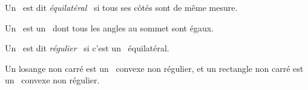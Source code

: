 \begin{defi}
	Un \ngone\ est dit \og \emph{équilatéral} \fg\ si tous ses côtés sont de même mesure.
\end{defi}


\begin{defi}
	Un \og \emph{\niso} \fg\ est un \ngone\ dont tous les angles au sommet sont égaux.
\end{defi}


\begin{defi}
	Un \ngone\ est dit \og \emph{régulier} \fg\ si c'est un \niso\ équilatéral.
\end{defi}


\begin{remark}
	Un losange non carré est un \nequi\ convexe non régulier, et un rectangle non carré est un \niso\ convexe non régulier.
\end{remark}

